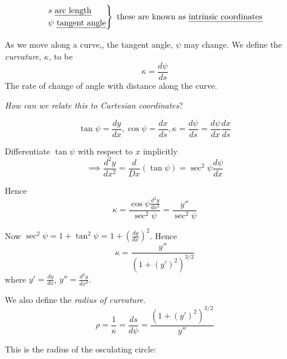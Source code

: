 \documentclass[twoside]{scrartcl}
\begin{document}
\begin{definition}
\[\begin{rcases*}
s \text{ \emph{arc length}}\\
\psi \text{ \emph{tangent angle}}	
\end{rcases*} \text{ these are known as \emph{intrinsic coordinates}}
\]
\end{definition}


\begin{definition}
As we move along a curve,, the tangent angle, $\psi$ may change. We define the \emph{curvature}, $\kappa$, to be 
\[\kappa = \frac{d\psi}{ds}\]	
The rate of change of angle with distance along the curve. 
\end{definition}

\emph{How can we relate this to Cartesian coordinates}? 

\[\tan\psi = \frac{dy}{dx}, \cos\psi = \frac{dx}{ds}, \kappa = \frac{d\psi}{ds} = \frac{d\psi}{dx}\frac{dx}{ds}\]

Differentiate $\tan\psi$ with respect to $x$ implicitly
\[\implies \frac{d^2y}{dx^2} = \frac{d}{Dx}(\tan\psi) = \sec^2\psi\frac{d\psi}{dx}\]

Hence 
\[\kappa = \frac{\cos\psi\frac{d^2y}{dx^2}}{\sec^2\psi} = \frac{y''}{\sec^2\psi}\]

Now $\sec^2\psi = 1 + \tan^2\psi = 1+\left(\frac{dy}{dx}\right)^2$. Hence 
\[\boxed{\kappa = \frac{y''}{(1 + (y')^2)^{3/2}}}\]
where $y' = \frac{dy}{dx}$, $y'' = \frac{d^2y}{dx^2}$.\\

\begin{definition}
We also define the \emph{radius of curvature}. 
\[\rho = \frac{1}{\kappa} = \frac{ds}{d\psi} = \frac{(1 + (y')^2)^{3/2}}{y''}\]
\end{definition}

This is the radius of the osculating circle: 
\begin{center}
\end{center}
\end{document}
